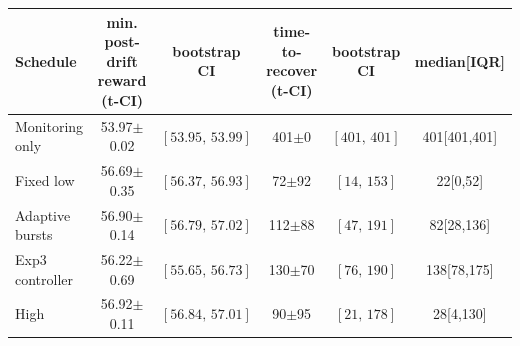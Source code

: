 \begin{tabular}{lccccc}
\toprule
Schedule & min. post-drift reward (t-CI) & bootstrap CI & time-to-recover (t-CI) & bootstrap CI & median[IQR]\\
\midrule
Monitoring only & 53.97$\pm$0.02 & $[53.95,\,53.99]$ & 401$\pm$0 & $[401,\,401]$ & 401[401,401]\\
Fixed low & 56.69$\pm$0.35 & $[56.37,\,56.93]$ & 72$\pm$92 & $[14,\,153]$ & 22[0,52]\\
Adaptive bursts & 56.90$\pm$0.14 & $[56.79,\,57.02]$ & 112$\pm$88 & $[47,\,191]$ & 82[28,136]\\
Exp3 controller & 56.22$\pm$0.69 & $[55.65,\,56.73]$ & 130$\pm$70 & $[76,\,190]$ & 138[78,175]\\
High & 56.92$\pm$0.11 & $[56.84,\,57.01]$ & 90$\pm$95 & $[21,\,178]$ & 28[4,130]\\
\bottomrule
\end{tabular}
